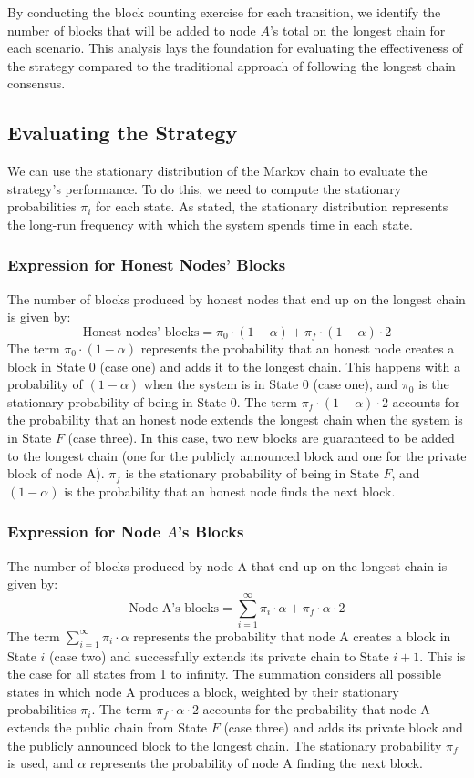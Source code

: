 By conducting the block counting exercise for each transition, we identify the number of blocks that will be added to node $A$'s total on the longest chain for each scenario. This analysis lays the foundation for evaluating the effectiveness of the strategy compared to the traditional approach of following the longest chain consensus.

\subsection{Evaluating the Strategy}
We can use the stationary distribution of the Markov chain to evaluate the strategy's performance. To do this, we need to compute the stationary probabilities $\pi_i$ for each state. As stated, the stationary distribution represents the long-run frequency with which the system spends time in each state.

\subsubsection{Expression for Honest Nodes' Blocks}
The number of blocks produced by honest nodes that end up on the longest chain is given by:
$$
\text{Honest nodes' blocks} = \pi_0 \cdot (1 - \alpha) + \pi_f \cdot (1 - \alpha) \cdot 2$$
The term $\pi_0 \cdot (1 - \alpha)$ represents the probability that an honest node creates a block in State 0 (case one) and adds it to the longest chain. This happens with a probability of $(1 - \alpha)$ when the system is in State 0 (case one), and $\pi_0$ is the stationary probability of being in State 0.
The term $\pi_f \cdot (1 - \alpha) \cdot 2$ accounts for the probability that an honest node extends the longest chain when the system is in State $F$ (case three). In this case, two new blocks are guaranteed to be added to the longest chain (one for the publicly announced block and one for the private block of node A). $\pi_f$ is the stationary probability of being in State $F$, and $(1 - \alpha)$ is the probability that an honest node finds the next block.

\subsubsection{Expression for Node $A$'s Blocks}
The number of blocks produced by node A that end up on the longest chain is given by:
$$
\text{Node A's blocks} = \sum_{i=1}^{\infty} \pi_i \cdot \alpha + \pi_f \cdot \alpha \cdot 2
$$
The term $\sum_{i=1}^{\infty} \pi_i \cdot \alpha$ represents the probability that node A creates a block in State $i$ (case two) and successfully extends its private chain to State $i+1$. This is the case for all states from 1 to infinity. The summation considers all possible states in which node A produces a block, weighted by their stationary probabilities $\pi_i$.
The term $\pi_f \cdot \alpha \cdot 2$ accounts for the probability that node A extends the public chain from State $F$ (case three) and adds its private block and the publicly announced block to the longest chain. The stationary probability $\pi_f$ is used, and $\alpha$ represents the probability of node A finding the next block.\\

